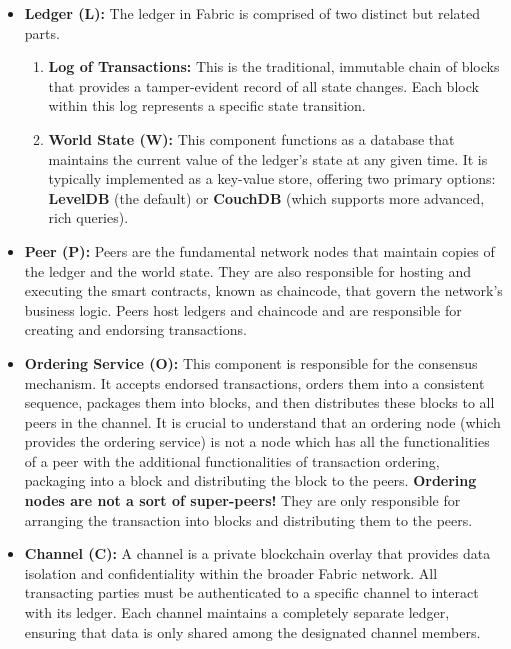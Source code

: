 \documentclass{scrbook}
\begin{document}
\begin{itemize}
    \item \textbf{Ledger (L):} The ledger in Fabric is comprised of two distinct but related parts.
    \begin{enumerate}
        \item \textbf{Log of Transactions:} This is the traditional, immutable chain of blocks that provides a tamper-evident record of all state changes. Each block within this log represents a specific state transition.
        \item \textbf{World State (W):} This component functions as a database that maintains the current value of the ledger's state at any given time. It is typically implemented as a key-value store, offering two primary options: \textbf{LevelDB} (the default) or \textbf{CouchDB} (which supports more advanced, rich queries).
    \end{enumerate}
    
    \item \textbf{Peer (P):} Peers are the fundamental network nodes that maintain copies of the ledger and the world state. They are also responsible for hosting and executing the smart contracts, known as chaincode, that govern the network's business logic. Peers host ledgers and chaincode and are responsible for creating and endorsing transactions.
    
    \item \textbf{Ordering Service (O):} This component is responsible for the consensus mechanism. It accepts endorsed transactions, orders them into a consistent sequence, packages them into blocks, and then distributes these blocks to all peers in the channel. It is crucial to understand that an ordering node (which provides the ordering service) is not a node which has all the functionalities of a peer with the additional functionalities of transaction ordering, packaging into a block and distributing the block to the peers. \textbf{Ordering nodes are not a sort of super-peers!} They are only responsible for arranging the transaction into blocks and distributing them to the peers.
    
    \item \textbf{Channel (C):} A channel is a private blockchain overlay that provides data isolation and confidentiality within the broader Fabric network. All transacting parties must be authenticated to a specific channel to interact with its ledger. Each channel maintains a completely separate ledger, ensuring that data is only shared among the designated channel members.
\end{itemize}
\end{document}
